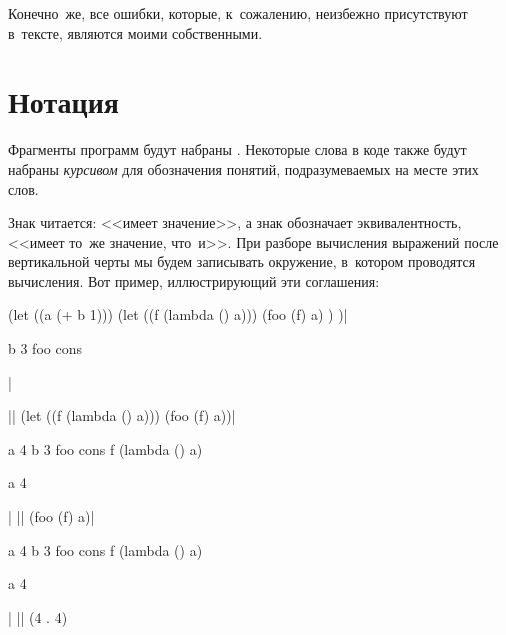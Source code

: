Конечно~же, все ошибки, которые, к~сожалению, неизбежно присутствуют в~тексте,
являются моими собственными.


\section*{Нотация}\label{pref/sect:notation}

Фрагменты программ будут набраны . Некоторые слова в коде также
будут набраны \textit{курсивом} для обозначения понятий, подразумеваемых на
месте этих слов.

Знак {\is} читается: <<имеет значение>>, а знак {\equals} обозначает
эквивалентность, <<имеет то~же значение, что~и>>. При разборе вычисления
выражений после вертикальной черты мы будем записывать окружение, в~котором
проводятся вычисления. Вот пример, иллюстрирующий эти соглашения:

\begin{code:lisp}
(let ((a (+ b 1)))
  (let ((f (lambda () a)))
    (foo (f) a) ) )|\begin{where}
                    \- b {\is} 3
                    \- foo {\eq} cons
                    \end{where}|

|\eq| (let ((f (lambda () a))) (foo (f) a))|\begin{where}
                                            \- a {\is} 4
                                            \- b {\is} 3
                                            \- foo {\eq} cons
                                            \- f {\eq} (lambda () a)\begin{where}
                                                                   \- a {\is} 4
                                                                   \end{where}
                                            \end{where}|
|\eq| (foo (f) a)|\begin{where}
                  \- a {\is} 4
                  \- b {\is} 3
                  \- foo {\eq} cons
                  \- f {\eq} (lambda () a)\begin{where}
                                         \- a {\is} 4
                                         \end{where}
                  \end{where}|
|\is| (4 . 4)
\end{code:lisp}

